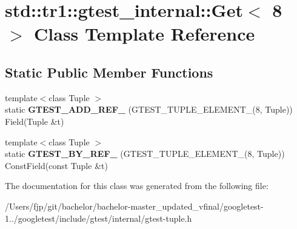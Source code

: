 \hypertarget{classstd_1_1tr1_1_1gtest__internal_1_1_get_3_018_01_4}{}\section{std\+:\+:tr1\+:\+:gtest\+\_\+internal\+:\+:Get$<$ 8 $>$ Class Template Reference}
\label{classstd_1_1tr1_1_1gtest__internal_1_1_get_3_018_01_4}
\subsection*{Static Public Member Functions}
\begin{DoxyCompactItemize}
\item 
\mbox{\label{classstd_1_1tr1_1_1gtest__internal_1_1_get_3_018_01_4_adf667300b7efed278f4ee3bf4d2edb85}} 
{\footnotesize template$<$class Tuple $>$ }\\static {\bfseries G\+T\+E\+S\+T\+\_\+\+A\+D\+D\+\_\+\+R\+E\+F\+\_\+} (G\+T\+E\+S\+T\+\_\+\+T\+U\+P\+L\+E\+\_\+\+E\+L\+E\+M\+E\+N\+T\+\_\+(8, Tuple)) Field(Tuple \&t)
\item 
\mbox{\label{classstd_1_1tr1_1_1gtest__internal_1_1_get_3_018_01_4_ab9645513ad2f983157f4062c89e910e7}} 
{\footnotesize template$<$class Tuple $>$ }\\static {\bfseries G\+T\+E\+S\+T\+\_\+\+B\+Y\+\_\+\+R\+E\+F\+\_\+} (G\+T\+E\+S\+T\+\_\+\+T\+U\+P\+L\+E\+\_\+\+E\+L\+E\+M\+E\+N\+T\+\_\+(8, Tuple)) Const\+Field(const Tuple \&t)
\end{DoxyCompactItemize}


The documentation for this class was generated from the following file\+:\begin{DoxyCompactItemize}
\item 
/\+Users/fjp/git/bachelor/bachelor-\/master\+\_\+updated\+\_\+vfinal/googletest-\/1../googletest/include/gtest/internal/gtest-\/tuple.\+h\end{DoxyCompactItemize}
